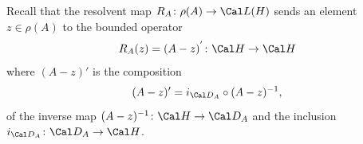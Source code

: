 

Recall that the resolvent map \(R_A\colon\rho(A)\to\Cal L(H)\) sends
an element \(z\in\rho(A)\) to the bounded operator
\begin{equation}
  R_A(z) = (A-z)^{'} \colon \Cal H\to\Cal H
\end{equation}
where \((A-z)'\) is the composition
\begin{equation}
  (A-z)' = i_{\Cal D_A}\circ(A-z)^{-1}
,\end{equation}
of the inverse map \((A-z)^{-1}\colon\Cal H\to\Cal D_A\) and the
inclusion \(i_{\Cal D_A}\colon\Cal D_A\to\Cal H\).


